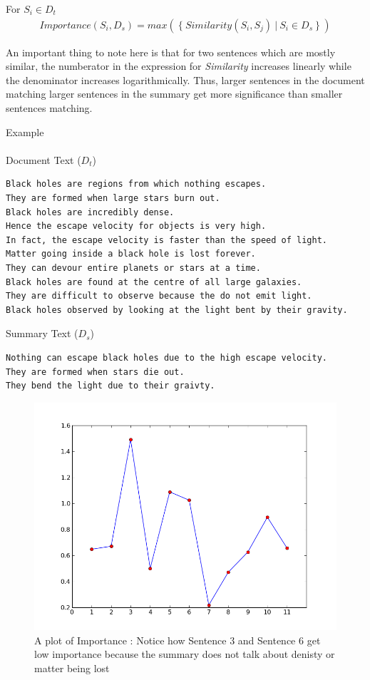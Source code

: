 \documentclass[paper=a4, fontsize=11pt]{scrartcl} %
\numberwithin{equation}{section} %
\numberwithin{figure}{section} %
\numberwithin{table}{section} %
\begin{document}
For $S_i \in D_t$ 
\begin{align}
Importance(S_i,D_s) = max(\ \{\ Similarity(S_i,S_j)\ |\ S_i \in D_s\ \}\ )  
\end{align}

An important thing to note here is that for two sentences which are mostly similar, the numberator in the expression for \emph{Similarity} increases linearly while the denominator increases logarithmically. Thus, larger sentences in the document matching larger sentences in the  summary get more significance than smaller sentences matching.\\
\par
{{\large Example}}
\\
\\
{Document Text ($D_t$)}
\begin{lstlisting}
Black holes are regions from which nothing escapes.
They are formed when large stars burn out.
Black holes are incredibly dense.
Hence the escape velocity for objects is very high.
In fact, the escape velocity is faster than the speed of light.
Matter going inside a black hole is lost forever.
They can devour entire planets or stars at a time.
Black holes are found at the centre of all large galaxies.
They are difficult to observe because the do not emit light.
Black holes observed by looking at the light bent by their gravity.
\end{lstlisting}
 \vspace{1.2em}
{Summary Text ($D_s$)}
\begin{lstlisting}
Nothing can escape black holes due to the high escape velocity.
They are formed when stars die out.
They bend the light due to their graivty.
\end{lstlisting}

\begin{figure}
  
  \centering
    \includegraphics[width=1\textwidth]{images/importance}
    \caption{A plot of Importance : Notice how Sentence 3 and Sentence 6 get low importance because the summary does not talk about denisty or matter being lost}
\end{figure}
\end{document}
